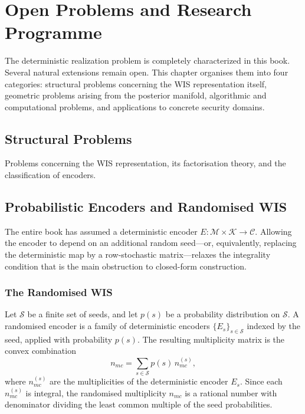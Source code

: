\chapter[Open Problems and Research Programme]{Open Problems and Research Programme}\label{ch:sec:open}

The deterministic realization problem is completely characterized in this book.  Several natural extensions remain open.  This chapter organises them into four categories: structural problems concerning the WIS representation itself, geometric problems arising from the posterior manifold, algorithmic and computational problems, and applications to concrete security domains.

\section*{Structural Problems}

Problems concerning the WIS representation, its factorisation theory, and the classification of encoders.

\section{Probabilistic Encoders and Randomised WIS}\label{ch:sec:probabilistic-encoders-and-randomised-wis}

The entire book has assumed a deterministic encoder
$E:\mathcal M\times\mathcal K\to\mathcal C$.  Allowing the encoder
to depend on an additional random seed---or, equivalently, replacing
the deterministic map by a row-stochastic matrix---relaxes the
integrality condition that is the main obstruction to closed-form
construction.

\subsection{The Randomised WIS}\label{ch:sec:the-randomised-wis}

Let $\mathcal S$ be a finite set of seeds, and let
$p(s)$ be a probability distribution on $\mathcal S$.
A randomised encoder is a family of deterministic encoders
$\{E_s\}_{s\in\mathcal S}$ indexed by the seed, applied with
probability $p(s)$.  The resulting multiplicity matrix is the
convex combination
\[
n_{mc} = \sum_{s\in\mathcal S} p(s)\,n_{mc}^{(s)},
\]
where $n_{mc}^{(s)}$ are the multiplicities of the deterministic
encoder $E_s$.  Since each $n_{mc}^{(s)}$ is integral, the
randomised multiplicity $n_{mc}$ is a rational number with
denominator dividing the least common multiple of the seed
probabilities.


